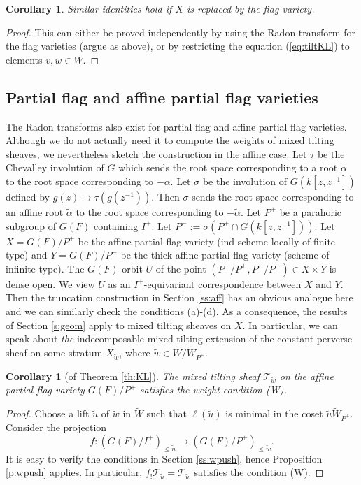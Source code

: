 \documentclass{amsart}
\theoremstyle{plain}
\newtheorem{cor}[subsubsection]{Corollary}
\theoremstyle{definition}
\theoremstyle{remark}
\numberwithin{equation}{subsection}
\begin{document}
\begin{cor}
Similar identities hold if $X$ is replaced by the flag variety.
\end{cor}
\begin{proof}
This can either be proved independently by using the Radon transform for the flag varieties (argue as above), or by restricting the equation (\ref{eq:tiltKL}) to elements $v,w\in W$. 
\end{proof}

\subsection{Partial flag and affine partial flag varieties}

The Radon transforms also exist for partial flag and affine partial flag varieties. Although we do not actually need it to compute the weights of mixed tilting sheaves, we nevertheless sketch the construction in the affine case. Let $\tau$ be the Chevalley involution of $G$ which sends the root space corresponding to a root $\alpha$ to the root space corresponding to $-\alpha$. Let $\sigma$ be the involution of $G(k[z,z^{-1}])$ defined by $g(z)\mapsto \tau(g(z^{-1}))$. Then $\sigma$ sends the root space corresponding to an affine root ${\widetilde{\alpha}}$ to the root space corresponding to $-{\widetilde{\alpha}}$. Let $P^+$ be a parahoric subgroup of $G(F)$ containing $I^+$. Let $P^-:=\sigma(P^+\cap G(k[z,z^{-1}]))$. Let $X=G(F)/P^+$ be the affine partial flag variety (ind-scheme locally of finite type) and $Y=G(F)/P^-$ be the thick affine partial flag variety (scheme of infinite type). The $G(F)$-orbit $U$ of the point $(P^+/P^+,P^-/P^-)\in X\times Y$ is dense open. We view $U$ as an $I^+$-equivariant correspondence between $X$ and $Y$. Then the truncation construction in Section \ref{ss:aff} has an obvious analogue here and we can similarly check the conditions (a)-(d). As a consequence, the results of Section \ref{s:geom} apply to mixed tilting sheaves on $X$. In particular, we can speak about {\em the} indecomposable mixed tilting extension of the constant perverse sheaf on some stratum $X_{\widetilde{w}}$, where ${\widetilde{w}}\in{\widetilde{W}}/{\widetilde{W}}_{P^+}$. 

\begin{cor}[of Theorem \ref{th:KL}]
The mixed tilting sheaf ${\mathcal{T}}_{\widetilde{w}}$ on the affine partial flag variety $G(F)/P^+$ satisfies the weight condition \textup{(W)}.
\end{cor}
\begin{proof}
Choose a lift ${\widetilde{u}}$ of ${\widetilde{w}}$ in ${\widetilde{W}}$ such that $\ell({\widetilde{u}})$ is minimal in the coset ${\widetilde{u}}{\widetilde{W}}_{P^+}$. Consider the projection
\begin{equation*}
f:(G(F)/I^+)_{\leq{\widetilde{u}}}\to(G(F)/P^+)_{\leq{\widetilde{w}}}.
\end{equation*}
It is easy to verify the conditions in Section \ref{ss:wpush}, hence Proposition \ref{p:wpush} applies. In particular, $f_!{\mathcal{T}}_{\widetilde{u}}={\mathcal{T}}_{\widetilde{w}}$ satisfies the condition (W).
\end{proof}
\end{document}
